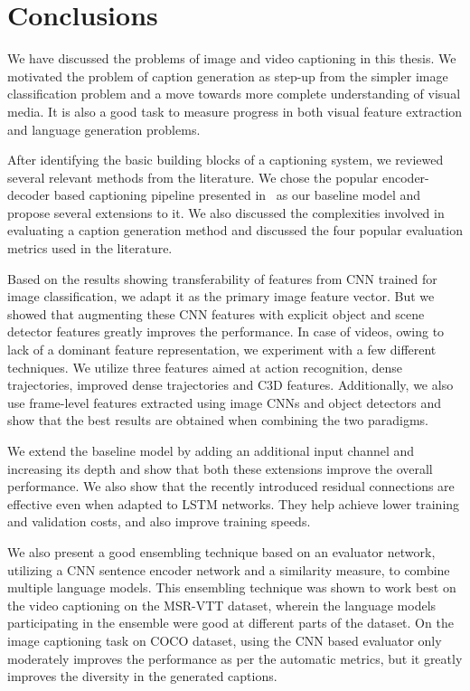 \chapter{Conclusions}
\label{chapter:conclusions}

We have discussed the problems of image and video captioning in this thesis.
%
We motivated the problem of caption generation as step-up from the simpler image
classification problem and a move towards more complete understanding of visual
media.
It is also a good task to measure progress in both visual feature extraction and
language generation problems.

After identifying the basic building blocks of a captioning system, we reviewed
several relevant methods from the literature.
We chose the popular encoder-decoder based captioning pipeline presented
in~\cite{Vinyals_2015_CVPR} as our baseline model and propose several extensions
to it.
We also discussed the complexities involved in evaluating a caption generation
method and discussed the four popular evaluation metrics used in the literature.

Based on the results showing transferability of features from CNN trained for
image classification, we adapt it as the primary image feature vector.
But we showed that augmenting these CNN features with explicit object and scene
detector features greatly improves the performance.
In case of videos, owing to lack of a dominant feature representation, we
experiment with a few different techniques.
We utilize three features aimed at action recognition, dense trajectories,
improved dense trajectories and C3D features.
Additionally, we also use frame-level features extracted using image CNNs and
object detectors and show that the best results are obtained when combining the
two paradigms.

We extend the baseline model by adding an additional input channel and
increasing its depth and show that both these extensions improve the overall
performance.
We also show that the recently introduced residual connections are effective
even when adapted to LSTM networks.
They help achieve lower training and validation costs, and also improve training
speeds.

We also present a good ensembling technique based on an evaluator network,
utilizing a CNN sentence encoder network and a similarity measure, to combine
multiple language models.
This ensembling technique was shown to work best on the video captioning on
the MSR-VTT dataset, wherein the language models participating in the ensemble were
good at different parts of the dataset.
On the image captioning task on COCO dataset, using the CNN based evaluator only
moderately improves the performance as per the automatic metrics, but it greatly
improves the diversity in the generated captions.

